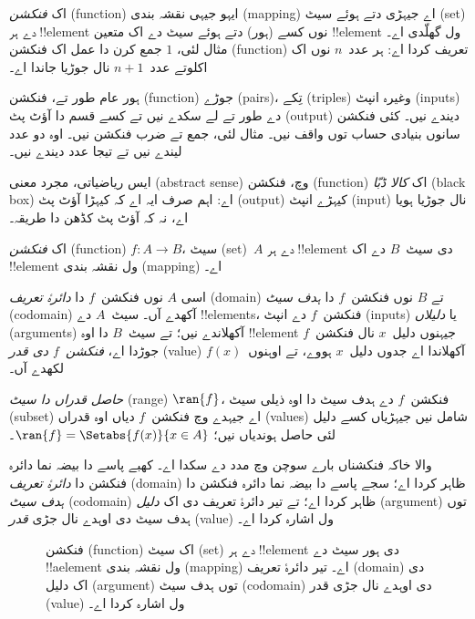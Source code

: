 \documentclass[../../../include/open-logic-section]{subfiles}
\begin{document}

\begin{explain}
اک \emph{فنکشن} (function) ایہو جیہی نقشہ بندی (mapping) اے جیہڑی دتے ہوئے سیٹ (set) دے ہر
!!{element} نوں کسے (ہور) دتے ہوئے سیٹ دے اک متعین !!{element} ول
گھلّدی اے۔ مثال لئی، $1$ جمع کرن دا عمل اک فنکشن (function) تعریف کردا اے: ہر
عدد~$n$ نوں اک اکلوتے عدد~$n+1$ نال جوڑیا جاندا اے۔

ہور عام طور تے، فنکشن (function) جوڑے (pairs)، تِکے (triples) وغیرہ انپٹ (inputs) دے طور تے لے سکدے نیں
تے کسے قسم دا آؤٹ پٹ (output) دیندے نیں۔ کئی فنکشن سانوں بنیادی حساب توں
واقف نیں۔ مثال لئی، جمع تے ضرب فنکشن نیں۔ اوہ دو عدد لیندے نیں تے
تیجا عدد دیندے نیں۔

ایس ریاضیاتی، مجرد معنی (abstract sense) وچ، فنکشن (function) اک \emph{کالا ڈبّا} (black box) اے: اہم صرف
ایہ اے کہ کیہڑا آؤٹ پٹ (output) کیہڑے انپٹ (input) نال جوڑیا ہویا اے، نہ کہ آؤٹ پٹ
کڈھن دا طریقہ۔
\end{explain}

\begin{defn}
اک \emph{فنکشن} (function) $f \colon A \to B$، سیٹ (set)~$A$ دے ہر !!{element} دی
سیٹ~$B$ دے اک !!{element} ول نقشہ بندی (mapping) اے۔

اسی $A$ نوں فنکشن~$f$ دا \emph{دائرۂ تعریف} (domain) تے $B$ نوں فنکشن~$f$ دا
\emph{ہدف سیٹ} (codomain) آکھدے آں۔ سیٹ~$A$ دے !!{element}s، فنکشن~$f$ دے انپٹ
(inputs) یا \emph{دلیلاں} (arguments) آکھلاندے نیں؛ تے سیٹ~$B$ دا اوہ !!{element} جیہنوں
دلیل~$x$ نال فنکشن~$f$ جوڑدا اے، \emph{فنکشن~$f$ دی قدر} (value) آکھلاندا اے
جدوں دلیل~$x$ ہووے، تے اوہنوں~$f(x)$ لکھدے آں۔

\emph{حاصل قدراں دا سیٹ} (range) $\ran{f}$، فنکشن~$f$ دے ہدف سیٹ دا اوہ ذیلی
سیٹ (subset) اے جیہدے وچ فنکشن~$f$ دیاں اوہ قدراں (values) شامل نیں جیہڑیاں کسے دلیل
لئی حاصل ہوندیاں نیں؛ $\ran{f} = \Setabs{f(x)}{x \in A}$۔
\end{defn}

 والا خاکہ فنکشناں بارے سوچن وچ مدد دے سکدا اے۔
کھبے پاسے دا بیضہ نما دائرہ فنکشن دا \emph{دائرۂ تعریف} (domain) ظاہر کردا اے؛
سجے پاسے دا بیضہ نما دائرہ فنکشن دا \emph{ہدف سیٹ} (codomain) ظاہر کردا اے؛ تے
تیر دائرۂ تعریف دی اک \emph{دلیل} (argument) توں ہدف سیٹ دی اوہدے نال جڑی
\emph{قدر} (value) ول اشارہ کردا اے۔

\begin{figure}
  \caption{فنکشن (function) اک سیٹ (set) دے ہر !!{element} دی ہور سیٹ دے !!a{element}
    ول نقشہ بندی (mapping) اے۔ تیر دائرۂ تعریف (domain) دی اک دلیل (argument) توں ہدف سیٹ (codomain) دی
    اوہدے نال جڑی قدر (value) ول اشارہ کردا اے۔}
\end{figure}
\end{document}

